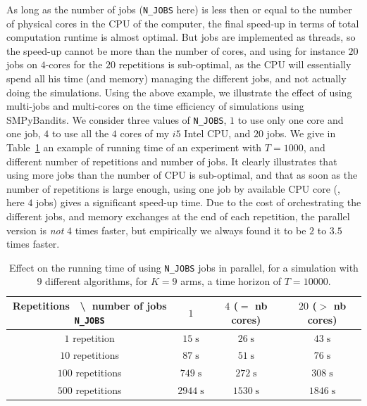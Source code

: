 As long as the number of jobs (\texttt{N\_JOBS} here) is less then or equal to the number of physical cores in the CPU of the computer, the final speed-up in terms of total computation runtime is almost optimal.
But jobs are implemented as threads, so the speed-up cannot be more than the number of cores, and using for instance $20$ jobs on $4$-cores for the $20$ repetitions is sub-optimal, as the CPU will essentially spend all his time (and memory) managing the different jobs, and not actually doing the simulations.
Using the above example, we illustrate the effect of using multi-jobs and multi-cores on the time efficiency of simulations using SMPyBandits. We consider three values of \texttt{N\_JOBS}, $1$ to use only one core and one job, $4$ to use all the $4$ cores of my $i5$ Intel CPU, and $20$ jobs.
We give in Table~\ref{table:3:speedUpTimeParallelComputations} an example of running time of an experiment with $T=1000$, and different number of repetitions and number of jobs.
It clearly illustrates that using more jobs than the number of CPU is sub-optimal, and that as soon as the number of repetitions is large enough, using one job by available CPU core (\ie, here $4$ jobs) gives a significant speed-up time.
Due to the cost of orchestrating the different jobs, and memory exchanges at the end of each repetition, the parallel version is \emph{not} $4$ times faster, but empirically we always found it to be $2$ to $3.5$ times faster.


\begin{table}[ht]
    \centering
    \begin{tabular}{c|ccc}
    \textbf{Repetitions} $\;$ \textbackslash $\;$ number of jobs \texttt{N\_JOBS} & $1$ & $4$ ($=$ nb cores) & $20$ ($>$ nb cores) \\
        \hline
        $1$ repetition    & $15 \;\text{s}$ & $26 \;\text{s}$ & $43 \;\text{s}$ \\
        $10$ repetitions  & $87 \;\text{s}$ & $51 \;\text{s}$ & $76 \;\text{s}$ \\
        $100$ repetitions & $749 \;\text{s}$ & $272 \;\text{s}$ & $308 \;\text{s}$ \\
        $500$ repetitions & $2944 \;\text{s}$ & $1530 \;\text{s}$ & $1846 \;\text{s}$ \\
        \hline
    \end{tabular}
    \caption{Effect on the running time of using \texttt{N\_JOBS} jobs in parallel, for a simulation with $9$ different algorithms, for $K=9$ arms, a time horizon of $T=10000$.}
    \label{table:3:speedUpTimeParallelComputations}
\end{table}


